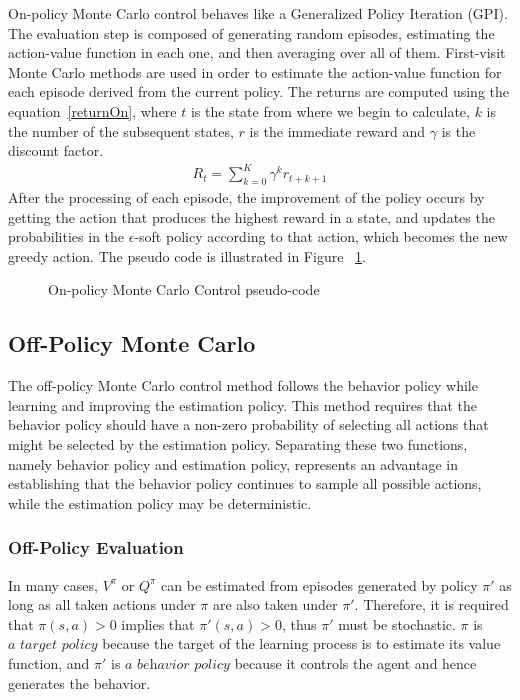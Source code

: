 \documentclass[paper=a4, fontsize=11pt]{scrartcl}
\numberwithin{equation}{section}		%
\numberwithin{figure}{section}			%
\numberwithin{table}{section}				%
\begin{document}
On-policy Monte Carlo control behaves like a Generalized Policy Iteration (GPI). The evaluation step is composed of generating random episodes, estimating the action-value function in each one, and then averaging over all of them. First-visit Monte Carlo methods are used in order to estimate the action-value function for each episode derived from the current policy. The returns are computed using the equation~\ref{returnOn}, where $t$ is the state from where we begin to calculate, $k$ is the number of the subsequent states, $r$ is the immediate reward and $\gamma$ is the discount factor.
\begin{align}
R_t = \sum_{k=0}^{K}\gamma^k r_{t+k+1} \label{returnOn}
\end{align}
After the processing of each episode, the improvement of the policy occurs by getting the action that produces the highest reward in a state, and updates the probabilities in the $\epsilon$-soft policy according to that action, which becomes the new greedy action. The pseudo code is illustrated in Figure ~\ref{onmc}.

\begin{figure}[ht] \centering
\caption{On-policy Monte Carlo Control pseudo-code} \label{onmc}
\end{figure}

\subsection{\textbf {Off-Policy Monte Carlo}}
The off-policy Monte Carlo control method follows the behavior policy while learning and improving the estimation policy. This method requires that the behavior policy should have a non-zero probability of selecting all actions that might be selected by the estimation policy. Separating these two functions, namely behavior policy and estimation policy, represents an advantage in establishing that the behavior policy continues to sample all possible actions, while the estimation policy may be deterministic.

\subsubsection*{Off-Policy Evaluation}
In many cases, $V^\pi$ or $Q^\pi$ can be estimated from episodes generated by policy $\pi'$ as long as all taken actions under $\pi$ are also taken under $\pi'$. Therefore, it is required that $\pi(s,a)>0$ implies that $\pi'(s,a)>0$, thus $\pi'$ must be stochastic. $\pi$ is $\textit{a target policy}$ because the target of the learning process is to estimate its value function, and $\pi'$ is $\textit{a behavior policy}$ because it controls the agent and hence generates the behavior.
\end{document}
